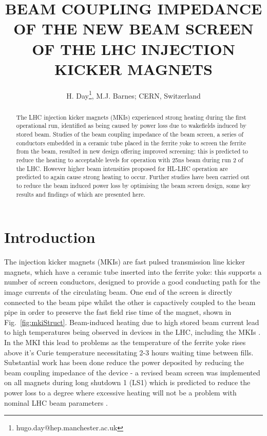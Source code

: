 \documentclass[a4paper,
              ]{jacow}
\begin{document}
\title{BEAM COUPLING IMPEDANCE OF THE NEW BEAM SCREEN OF THE LHC INJECTION KICKER MAGNETS}
\author{H. Day\thanks{hugo.day@hep.manchester.ac.uk}, M.J. Barnes;  CERN, Switzerland}

\maketitle 


\begin{abstract}
The LHC injection kicker magnets (MKIs) experienced strong heating during the first operational run, identified as being caused by power loss due to wakefields induced by stored beam. Studies of the beam coupling impedance of the beam screen, a series of conductors embedded in a ceramic tube placed in the ferrite yoke to screen the ferrite from the beam, resulted in new design offering improved screening: this is predicted to reduce the heating to acceptable levels for operation with 25ns beam during run 2 of the LHC. However higher beam intensities proposed for HL-LHC operation are predicted to again cause strong heating to occur. Further studies have been carried out to reduce the beam induced power loss by optimising the beam screen design, some key results and findings of which are presented here.
\end{abstract}

\section{Introduction}

The injection kicker magnets (MKIs) are fast pulsed transmission line kicker magnets, which have a ceramic tube inserted into the ferrite yoke: this supports a number of screen conductors, designed to provide a good conducting path for the image currents of the circulating beam. One end of the screen is directly connected to the beam pipe whilst the other is capactively coupled to the beam pipe in order to preserve the fast field rise time of the magnet, shown in Fig.~\ref{fig:mkiStruct}. Beam-induced heating due to high stored beam current lead to high temperatures being observed in devices in the LHC, including the MKIs \cite{mki-heatingTemp}. In the MKI this lead to problems as the temperature of the ferrite yoke rises above it's Curie temperature necessitating 2-3 hours waiting time between fills. Substantial work has been done reduce the power deposited by reducing the beam coupling impedance of the device - a revised beam screen was implemented on all magnets during long shutdown 1 (LS1) which is predicted to reduce the power loss to a degree where excessive heating will not be a problem with nominal LHC beam parameters \cite{mkiImp2014}. 
\end{document}
